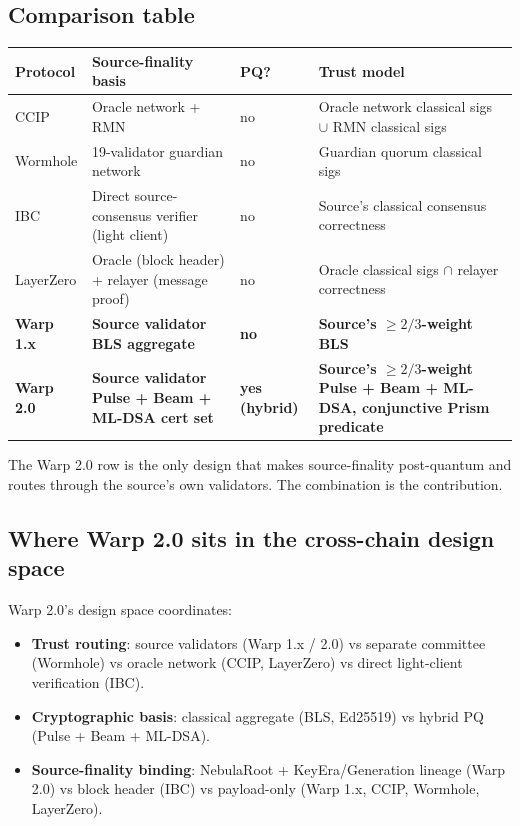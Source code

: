 \subsection{Comparison table}

\begin{tabular}{@{}p{}p{}p{}p{}@{}}
  \toprule
  \textbf{Protocol} & \textbf{Source-finality basis} & \textbf{PQ?} & \textbf{Trust model} \\
  \midrule
  CCIP & Oracle network + RMN & no & Oracle network classical sigs $\cup$ RMN classical sigs \\
  Wormhole & 19-validator guardian network & no & Guardian quorum classical sigs \\
  IBC & Direct source-consensus verifier (light client) & no & Source's classical consensus correctness \\
  LayerZero & Oracle (block header) + relayer (message proof) & no & Oracle classical sigs $\cap$ relayer correctness \\
  \textbf{Warp 1.x} & \textbf{Source validator BLS aggregate} & \textbf{no} & \textbf{Source's $\geq 2/3$-weight BLS} \\
  \textbf{Warp 2.0} & \textbf{Source validator Pulse + Beam + ML-DSA cert set} & \textbf{yes (hybrid)} & \textbf{Source's $\geq 2/3$-weight Pulse + Beam + ML-DSA, conjunctive Prism predicate} \\
  \bottomrule
\end{tabular}

The Warp 2.0 row is the only design that makes source-finality post-quantum and routes through the source's own validators. The combination is the contribution.

\subsection{Where Warp 2.0 sits in the cross-chain design space}

Warp 2.0's design space coordinates:
\begin{itemize}[leftmargin=2em,nosep]
  \item \textbf{Trust routing}: source validators (Warp 1.x / 2.0) vs separate committee (Wormhole) vs oracle network (CCIP, LayerZero) vs direct light-client verification (IBC).
  \item \textbf{Cryptographic basis}: classical aggregate (BLS, Ed25519) vs hybrid PQ (Pulse + Beam + ML-DSA).
  \item \textbf{Source-finality binding}: NebulaRoot + KeyEra/Generation lineage (Warp 2.0) vs block header (IBC) vs payload-only (Warp 1.x, CCIP, Wormhole, LayerZero).
\end{itemize}

